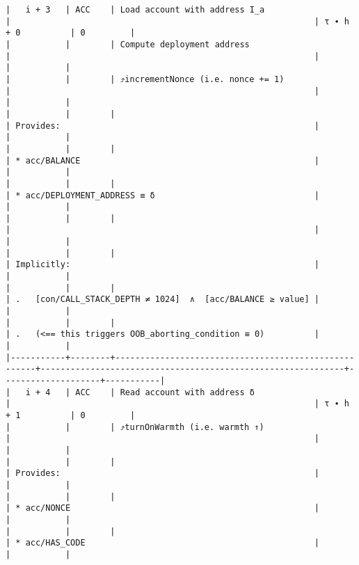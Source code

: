 \documentclass[varwidth=\maxdimen,margin=0.5cm,multi={verbatim}]{standalone}
\begin{document}
\begin{verbatim}
|   i + 3   | ACC    | Load account with address I_a                        |                                                             | τ ∙ h + 0          | 0         |
|           |        | Compute deployment address                           |                                                             |                    |           |
|           |        | ⤴️incrementNonce (i.e. nonce += 1)                   |                                                             |                    |           |
|           |        |                                                      | Provides:                                                   |                    |           |
|           |        |                                                      | * acc/BALANCE                                               |                    |           |
|           |        |                                                      | * acc/DEPLOYMENT_ADDRESS ≡ δ                                |                    |           |
|           |        |                                                      |                                                             |                    |           |
|           |        |                                                      | Implicitly:                                                 |                    |           |
|           |        |                                                      | .   [con/CALL_STACK_DEPTH ≠ 1024]  ∧  [acc/BALANCE ≥ value] |                    |           |
|           |        |                                                      | .   (<== this triggers OOB_aborting_condition ≡ 0)          |                    |           |
|-----------+--------+------------------------------------------------------+-------------------------------------------------------------+--------------------+-----------|
|   i + 4   | ACC    | Read account with address δ                          |                                                             | τ ∙ h + 1          | 0         |
|           |        | ⤴️turnOnWarmth (i.e. warmth ↑)                       |                                                             |                    |           |
|           |        |                                                      | Provides:                                                   |                    |           |
|           |        |                                                      | * acc/NONCE                                                 |                    |           |
|           |        |                                                      | * acc/HAS_CODE                                              |                    |           |

\end{verbatim}
\end{document}
